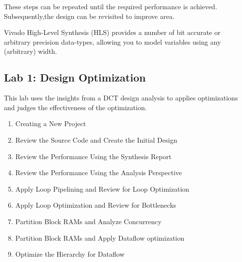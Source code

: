 These steps can be repeated until the required performance is achieved. Subsequently,the design can be revisited to improve area.

\begin{highlight}
    Vivado High-Level Synthesis (HLS) provides a number of bit accurate or arbitrary precision data-types, allowing you to model variables using any (arbitrary) width.
\end{highlight}

\subsection{Lab 1: Design Optimization}
This lab uses the insights from a DCT design analysis to applies optimizations and judges the effectiveness of the optimization.

\begin{enumerate}[label=Step \arabic*:]
    \item Creating a New Project 
    \item Review the Source Code and Create the Initial Design
    \item Review the Performance Using the Synthesis Report
    \item Review the Performance Using the Analysis Perspective
    \item Apply Loop Pipelining and Review for Loop Optimization
    \item Apply Loop Optimization and Review for Bottlenecks
    \item Partition Block RAMs and Analyze Concurrency
    \item Partition Block RAMs and Apply Dataflow optimization
    \item Optimize the Hierarchy for Dataflow
\end{enumerate}

